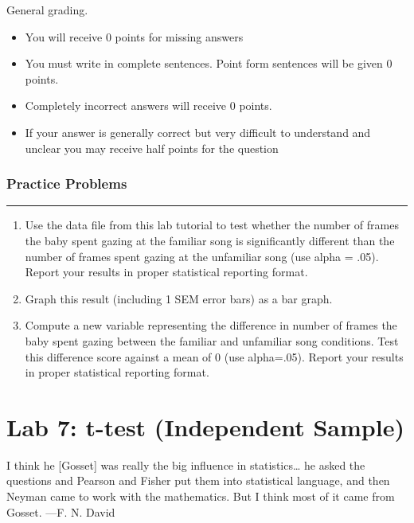 \documentclass[
]{book}
\providecommand{\tightlist}{%
  \setlength{\itemsep}{0pt}\setlength{\parskip}{0pt}}
\begin{document}
General grading.

\begin{itemize}
\tightlist
\item
  You will receive 0 points for missing answers
\item
  You must write in complete sentences. Point form sentences will be given 0 points.
\item
  Completely incorrect answers will receive 0 points.
\item
  If your answer is generally correct but very difficult to understand and unclear you may receive half points for the question
\end{itemize}

\hypertarget{practice-problems-4}{%
\subsection{Practice Problems}\label{practice-problems-4}}

\begin{center}\rule{0.5\linewidth}{0.5pt}\end{center}

\begin{enumerate}
\def\labelenumi{\arabic{enumi}.}
\item
  Use the data file from this lab tutorial to test whether the number of frames the baby spent gazing at the familiar song is significantly different than the number of frames spent gazing at the unfamiliar song (use alpha = .05). Report your results in proper statistical reporting format.
\item
  Graph this result (including 1 SEM error bars) as a bar graph.
\item
  Compute a new variable representing the difference in number of frames the baby spent gazing between the familiar and unfamiliar song conditions. Test this difference score against a mean of 0 (use alpha=.05). Report your results in proper statistical reporting format.
\end{enumerate}

\hypertarget{lab-7-t-test-independent-sample}{%
\chapter{Lab 7: t-test (Independent Sample)}\label{lab-7-t-test-independent-sample}}

{I think he {[}Gosset{]} was really the big influence in statistics\ldots{} he asked the questions and Pearson and Fisher put them into statistical language, and then Neyman came to work with the mathematics. But I think most of it came from Gosset. ---F. N. David}
\end{document}
